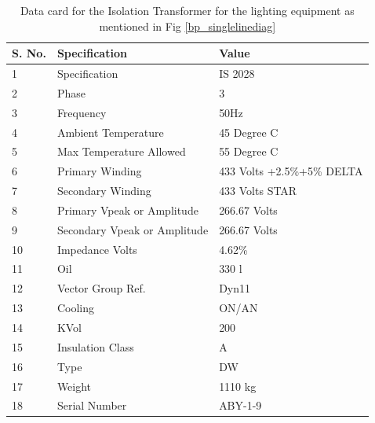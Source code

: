 \documentclass{report}
\begin{document}
	\begin{table}[h]
		\centering
		\begin{tabular}{@{}lll@{}}
			\toprule
			\textbf{S. No.} & \textbf{Specification}       & \textbf{Value}             \\ \midrule
			1               & Specification                & IS 2028                    \\
			2               & Phase                        & 3                          \\
			3               & Frequency                    & 50Hz                       \\
			4               & Ambient Temperature          & 45 Degree C                \\
			5               & Max Temperature Allowed      & 55 Degree C                \\
			6               & Primary Winding              & 433 Volts +2.5\%+5\% DELTA \\
			7               & Secondary Winding            & 433 Volts STAR             \\
			8               & Primary Vpeak or Amplitude   & 266.67 Volts               \\
			9               & Secondary Vpeak or Amplitude & 266.67 Volts               \\
			10              & Impedance Volts              & 4.62\%                     \\
			11              & Oil                          & 330 l                      \\
			12              & Vector Group Ref.            & Dyn11                      \\
			13              & Cooling                      & ON/AN                      \\
			14              & KVol                         & 200                        \\
			15              & Insulation Class             & A                          \\
			16              & Type                         & DW                         \\
			17              & Weight                       & 1110 kg                    \\
			18              & Serial Number                & ABY-1-9                    \\ \bottomrule
		\end{tabular}
		\caption{Data card for the Isolation Transformer for the lighting equipment as mentioned in Fig \ref{bp_singlelinediag}}
		\label{sanand_isolation_tf_datacard}
	\end{table}
\end{document}

